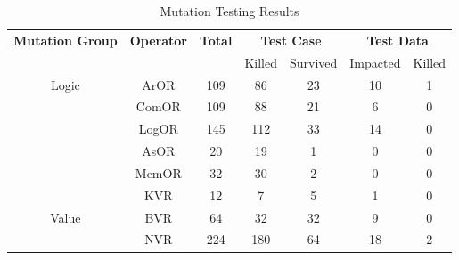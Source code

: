 \begin{table}[]
  \tabcolsep=1.0mm
  \begin{center}
  \caption{Mutation Testing Results}
  \vspace{-5pt}
  \begin{tabular}{ccccccc}
  \hline
  \multirow{2}{*}{\textbf{Mutation Group}} & \multirow{2}{*}{\textbf{Operator}} & \multirow{2}{*}{\textbf{Total}} & \multicolumn{2}{c}{\textbf{Test Case}} & \multicolumn{2}{c}{\textbf{Test Data}} \\ \cline{4-7} 
                                                       &                            &                       & Killed & Survived              & Impacted & Killed  \\ \hline
  \multicolumn{1}{c|}{\multirow{6}{*}{Logic}}          & \multicolumn{1}{c|}{ArOR}  & \multicolumn{1}{c|}{109} &86        & \multicolumn{1}{c|}{23} &10          & 1 \\
  \multicolumn{1}{c|}{}                                & \multicolumn{1}{c|}{ComOR} & \multicolumn{1}{c|}{109} &88        & \multicolumn{1}{c|}{21} &6          &0         \\
  \multicolumn{1}{c|}{}                                & \multicolumn{1}{c|}{LogOR} & \multicolumn{1}{c|}{145} &112        & \multicolumn{1}{c|}{33} &14          &0         \\
  \multicolumn{1}{c|}{}                                & \multicolumn{1}{c|}{AsOR}  & \multicolumn{1}{c|}{20} &19        & \multicolumn{1}{c|}{1} &0          &0         \\
  \multicolumn{1}{c|}{}                                & \multicolumn{1}{c|}{MemOR} & \multicolumn{1}{c|}{32} &30        & \multicolumn{1}{c|}{2} &0          &0         \\
  \multicolumn{1}{c|}{}                                & \multicolumn{1}{c|}{KVR}   & \multicolumn{1}{c|}{12} &7        & \multicolumn{1}{c|}{5} &1          &0         \\ \hline
  \multicolumn{1}{c|}{\multirow{3}{*}{Value}}          & \multicolumn{1}{c|}{BVR}   & \multicolumn{1}{c|}{64} &32        & \multicolumn{1}{c|}{32} &9          &0         \\
  \multicolumn{1}{c|}{}                                & \multicolumn{1}{c|}{NVR}   & \multicolumn{1}{c|}{224} &180        & \multicolumn{1}{c|}{64} &18          &2         \\

\end{tabular}
\end{center}
\end{table}
